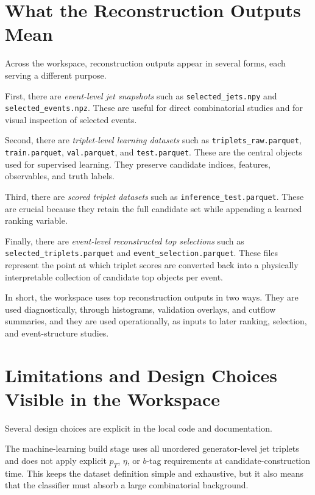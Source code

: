 \documentclass[11pt]{article}
\begin{document}
\section{What the Reconstruction Outputs Mean}

Across the workspace, reconstruction outputs appear in several forms, each serving a different purpose.

First, there are \emph{event-level jet snapshots} such as \texttt{selected\_jets.npy} and \texttt{selected\_events.npz}. These are useful for direct combinatorial studies and for visual inspection of selected events.

Second, there are \emph{triplet-level learning datasets} such as \texttt{triplets\_raw.parquet}, \texttt{train.parquet}, \texttt{val.parquet}, and \texttt{test.parquet}. These are the central objects used for supervised learning. They preserve candidate indices, features, observables, and truth labels.

Third, there are \emph{scored triplet datasets} such as \texttt{inference\_test.parquet}. These are crucial because they retain the full candidate set while appending a learned ranking variable.

Finally, there are \emph{event-level reconstructed top selections} such as \texttt{selected\_triplets.parquet} and \texttt{event\_selection.parquet}. These files represent the point at which triplet scores are converted back into a physically interpretable collection of candidate top objects per event.

In short, the workspace uses top reconstruction outputs in two ways. They are used diagnostically, through histograms, validation overlays, and cutflow summaries, and they are used operationally, as inputs to later ranking, selection, and event-structure studies.

\section{Limitations and Design Choices Visible in the Workspace}

Several design choices are explicit in the local code and documentation.

The machine-learning build stage uses all unordered generator-level jet triplets and does not apply explicit $p_T$, $\eta$, or $b$-tag requirements at candidate-construction time. This keeps the dataset definition simple and exhaustive, but it also means that the classifier must absorb a large combinatorial background.
\end{document}
